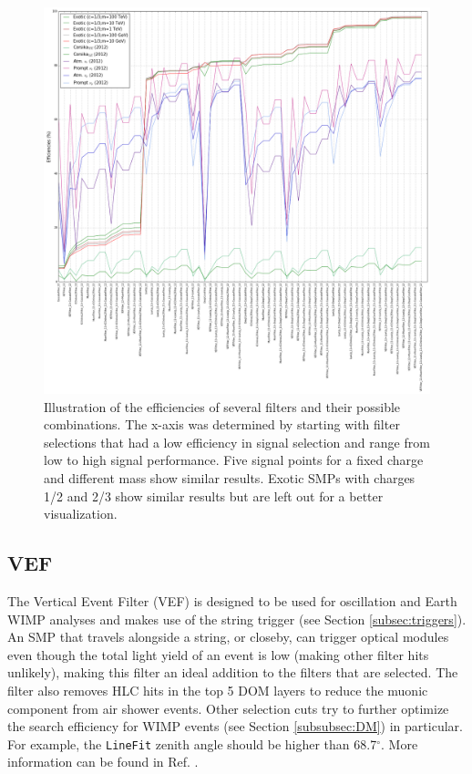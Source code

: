 \begin{figure}
\centering
\includegraphics[width=\textwidth]{chapter8/img/FilterRate.png}
\caption{Illustration of the efficiencies of several filters and their possible combinations. The x-axis was determined by starting with filter selections that had a low efficiency in signal selection and range from low to high signal performance. Five signal points for a fixed charge and different mass show similar results. Exotic SMPs with charges 1/2 and 2/3 show similar results but are left out for a better visualization.}
\label{fig:filterrate}
\end{figure}

\subsection{VEF}
The Vertical Event Filter (VEF) is designed to be used for oscillation and Earth WIMP analyses and makes use of the string trigger (see Section \ref{subsec:triggers}). An SMP that travels alongside a string, or closeby, can trigger optical modules even though the total light yield of an event is low (making other filter hits unlikely), making this filter an ideal addition to the filters that are selected. The filter also removes HLC hits in the top 5 DOM layers to reduce the muonic component from air shower events. Other selection cuts try to further optimize the search efficiency for WIMP events (see Section \ref{subsubsec:DM}) in particular. For example, the \texttt{LineFit} zenith angle should be higher than 68.7$^\circ$. More information can be found in Ref. \cite{VEF2012}.

